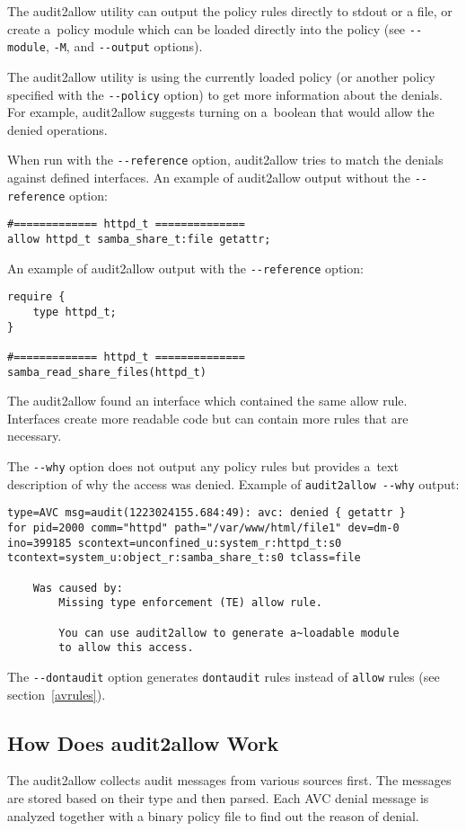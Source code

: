 The audit2allow utility can output the policy rules directly to stdout or a
file, or create a~policy module which can be loaded directly into the policy
(see \texttt{-{}-module}, \texttt{-M}, and \texttt{-{}-output} options).

The audit2allow utility is using the currently loaded policy (or another policy
specified with the \texttt{-{}-policy} option) to get more information about the
denials. For example, audit2allow suggests turning on a~boolean that would allow
the denied operations.

When run with the \texttt{-{}-reference} option, audit2allow tries to match the
denials against defined interfaces. An example of audit2allow output without the
\texttt{-{}-reference} option:
\begin{lstlisting}
#============= httpd_t ==============
allow httpd_t samba_share_t:file getattr;
\end{lstlisting}
An example of audit2allow output with the \texttt{-{}-reference} option:
\begin{lstlisting}
require {
	type httpd_t;
}

#============= httpd_t ==============
samba_read_share_files(httpd_t)
\end{lstlisting}
The audit2allow found an interface which contained the same allow rule.
Interfaces create more readable code but can contain more rules that are
necessary.

\pagebreak

The \texttt{-{}-why} option does not output any policy rules but provides a~text
description of why the access was denied. Example of \texttt{audit2allow
-{}-why} output:
\begin{lstlisting}
type=AVC msg=audit(1223024155.684:49): avc: denied { getattr }
for pid=2000 comm="httpd" path="/var/www/html/file1" dev=dm-0
ino=399185 scontext=unconfined_u:system_r:httpd_t:s0
tcontext=system_u:object_r:samba_share_t:s0 tclass=file

    Was caused by:
        Missing type enforcement (TE) allow rule.

        You can use audit2allow to generate a~loadable module
        to allow this access.
\end{lstlisting}

The \texttt{-{}-dontaudit} option generates \texttt{dontaudit} rules instead of
\texttt{allow} rules (see section~\ref{avrules}).

\subsection{How Does audit2allow Work}
The audit2allow collects audit messages from various sources first. The messages
are stored based on their type and then parsed. Each AVC denial message is
analyzed together with a binary policy file to find out the reason of denial.

